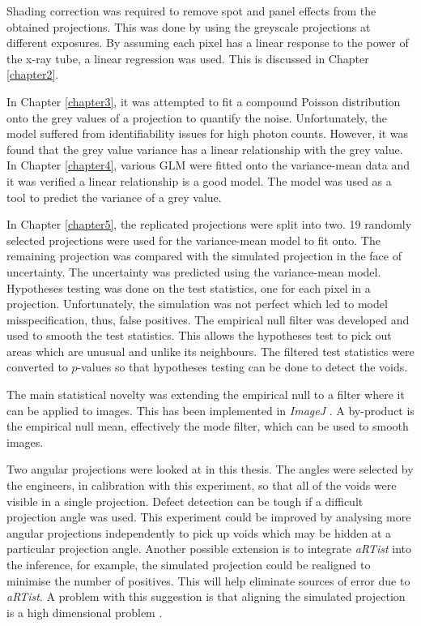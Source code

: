 \documentclass[12pt, a4paper, twoside]{memoir}
\begin{document}
Shading correction was required to remove spot and panel effects from the obtained projections. This was done by using the greyscale projections at different exposures. By assuming each pixel has a linear response to the power of the x-ray tube, a linear regression was used. This is discussed in Chapter \ref{chapter2}.

In Chapter \ref{chapter3}, it was attempted to fit a compound Poisson distribution onto the grey values of a projection to quantify the noise. Unfortunately, the model suffered from identifiability issues for high photon counts. However, it was found that the grey value variance has a linear relationship with the grey value. In Chapter \ref{chapter4}, various GLM were fitted onto the variance-mean data and it was verified a linear relationship is a good model. The model was used as a tool to predict the variance of a grey value.

In Chapter \ref{chapter5}, the replicated projections were split into two. 19 randomly selected projections were used for the variance-mean model to fit onto. The remaining projection was compared with the simulated projection in the face of uncertainty. The uncertainty was predicted using the variance-mean model. Hypotheses testing was done on the test statistics, one for each pixel in a projection. Unfortunately, the simulation was not perfect which led to model misspecification, thus, false positives. The empirical null filter was developed and used to smooth the test statistics. This allows the hypotheses test to pick out areas which are unusual and unlike its neighbours. The filtered test statistics were converted to $p$-values so that hypotheses testing can be done to detect the voids.

The main statistical novelty was extending the empirical null \citep{efron2004large} to a filter where it can be applied to images. This has been implemented in \emph{ImageJ} \citep{abramoff2004image, schneider2012nih, perez2013image}. A by-product is the empirical null mean, effectively the mode filter, which can be used to smooth images.

Two angular projections were looked at in this thesis. The angles were selected by the engineers, in calibration with this experiment, so that all of the voids were visible in a single projection. Defect detection can be tough if a difficult projection angle was used. This experiment could be improved by analysing more angular projections independently to pick up voids which may be hidden at a particular projection angle. Another possible extension is to integrate \emph{aRTist} into the inference, for example, the simulated projection could be realigned to minimise the number of positives. This will help eliminate sources of error due to \emph{aRTist}. A problem with this suggestion is that aligning the simulated projection is a high dimensional problem \citep{brierley2018optimized}.
\end{document}
